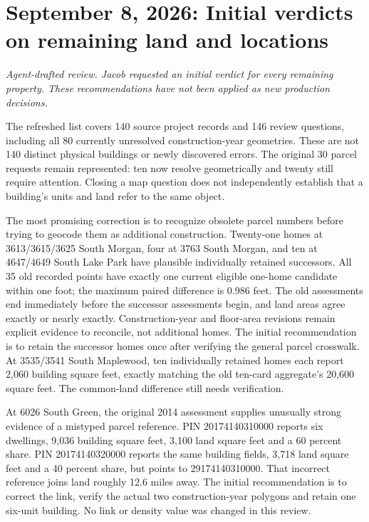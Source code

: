 \section*{September 8, 2026: Initial verdicts on remaining land and locations}
\textit{Agent-drafted review. Jacob requested an initial verdict for every remaining property. These recommendations have not been applied as new production decisions.}

The refreshed list covers 140 source project records and 146 review questions,
including all 80 currently unresolved construction-year geometries. These are
not 140 distinct physical buildings or newly discovered errors. The original
30 parcel requests remain represented: ten now resolve geometrically and twenty
still require attention. Closing a map question does not independently establish
that a building's units and land refer to the same object.

The most promising correction is to recognize obsolete parcel numbers before
trying to geocode them as additional construction. Twenty-one homes at
3613/3615/3625 South Morgan, four at 3763 South Morgan, and ten at 4647/4649
South Lake Park have plausible individually retained successors. All 35 old
recorded points have exactly one current eligible one-home candidate within
one foot; the maximum paired difference is 0.986 feet. The old assessments end
immediately before the successor assessments begin, and land areas agree
exactly or nearly exactly. Construction-year and floor-area revisions remain
explicit evidence to reconcile, not additional homes. The initial recommendation
is to retain the successor homes once after verifying the general parcel crosswalk.
At 3535/3541 South Maplewood, ten individually retained homes each report
2,060 building square feet, exactly matching the old ten-card aggregate's
20,600 square feet. The common-land difference still needs verification.

At 6026 South Green, the original 2014 assessment supplies unusually strong
evidence of a mistyped parcel reference. PIN 20174140310000 reports six dwellings,
9,036 building square feet, 3,100 land square feet and a 60 percent share.
PIN 20174140320000 reports the same building fields, 3,718 land square feet
and a 40 percent share, but points to 29174140310000. That incorrect reference
joins land roughly 12.6 miles away. The initial recommendation is to correct
the link, verify the actual two construction-year polygons and retain one
six-unit building. No link or density value was changed in this review.

